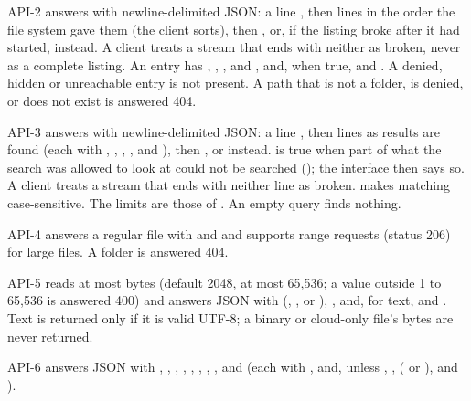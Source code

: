 \begin{req}{API-2}
 answers with newline-delimited JSON: a line , then
lines  in the order the file system gave them (the client
sorts), then , or, if the listing broke after it had started,
 instead.  A client treats a stream that ends
with neither as broken, never as a complete listing.  An entry has , ,
,  and , and, when true,  and
.  A denied, hidden or unreachable entry is not present.  A path that is
not a folder, is denied, or does not exist is answered 404.
\end{req}

\begin{req}{API-3}
 answers with newline-delimited JSON: a line
, then lines  as results are
found (each with , , , ,  and
), then , or
 instead.   is true when part
of what the search was allowed to look at could not be searched (); the
interface then says so.  A client treats a stream that ends with neither line as
broken.   makes matching case-sensitive.
The limits are those of .  An empty query finds nothing.
\end{req}

\begin{req}{API-4}
 answers a regular file with  and 
and supports range requests (status 206) for large files.  A folder is answered 404.
\end{req}

\begin{req}{API-5}
 reads at most  bytes (default 2048, at most 65{,}536; a
value outside 1 to 65{,}536 is answered 400) and answers JSON with 
(, ,  or ), , and, for
text,  and .  Text is returned only if it is valid UTF-8; a
binary or cloud-only file's bytes are never returned.
\end{req}

\begin{req}{API-6}
 answers JSON with , , , ,
, , , , 
and  (each with , and, unless , ,
 ( or ),  and ).
\end{req}

